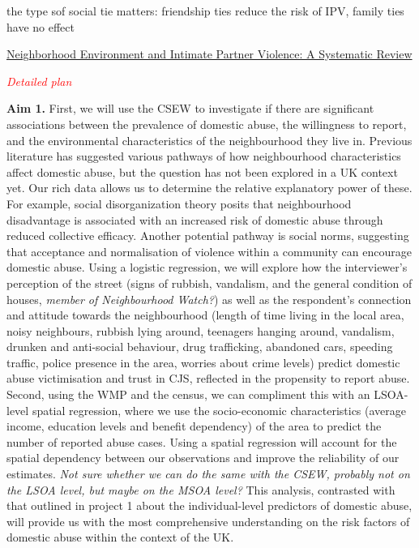 \documentclass[11pt, a4paper]{article}
\begin{document}
the type sof social tie matters: friendship ties reduce the risk of IPV, family ties have no effect

\href{https://journals.sagepub.com/doi/abs/10.1177/1524838013515758}{Neighborhood Environment and Intimate Partner Violence: A Systematic Review }

\textcolor{red}{\textit{Detailed plan}}

\textbf{Aim 1.} First, we will use the CSEW to investigate if there are significant associations between the prevalence of domestic abuse, the willingness to report, and the environmental characteristics of the neighbourhood they live in. Previous literature has suggested various pathways of how neighbourhood characteristics affect domestic abuse, but the question has not been explored in a UK context yet. Our rich data allows us to determine the relative explanatory power of these. For example, social disorganization theory posits that neighbourhood disadvantage is associated with an increased risk of domestic abuse through reduced collective efficacy. Another potential pathway is social norms, suggesting that acceptance and normalisation of violence within a community can encourage domestic abuse. Using a logistic regression, we will explore how the interviewer's perception of the street (signs of rubbish, vandalism, and the general condition of houses, \textit{member of Neighbourhood Watch?}) as well as the respondent's connection and attitude towards the neighbourhood (length of time living in the local area, noisy neighbours, rubbish lying around, teenagers hanging around, vandalism, drunken and anti-social behaviour, drug trafficking, abandoned cars, speeding traffic, police presence in the area, worries about crime levels) predict domestic abuse victimisation and trust in CJS, reflected in the propensity to report abuse. Second, using the WMP and the census, we can compliment this with an LSOA-level spatial regression, where we use the socio-economic characteristics (average income, education levels and benefit dependency) of the area to predict the number of reported abuse cases. Using a spatial regression will account for the spatial dependency between our observations and improve the reliability of our estimates. \textit{Not sure whether we can do the same with the CSEW, probably not on the LSOA level, but maybe on the MSOA level?} This analysis, contrasted with that outlined in project 1 about the individual-level predictors of domestic abuse, will provide us with the most comprehensive understanding on the risk factors of domestic abuse within the context of the UK.
\end{document}
